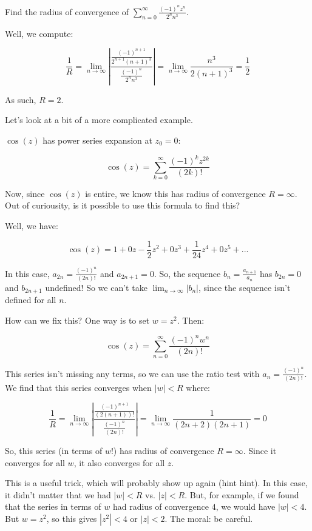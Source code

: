 \begin{ex}{}{} Find the radius of convergence of $\sum_{n = 0}^\infty \frac{(-1)^nz^n}{2^nn^3}$.

Well, we compute:

$$\frac{1}{R} = \lim_{n\rightarrow \infty} \left|\frac{\frac{(-1)^{n+1}}{2^{n+1}(n+1)^3}}{\frac{(-1)^n}{2^nn^3}}\right| = \lim_{n\rightarrow \infty} \frac{n^3}{2(n+1)^3} = \frac{1}{2}$$

As such, $R = 2$.
\end{ex}

Let's look at a bit of a more complicated example.

\begin{ex}{}{} $\cos(z)$ has power series expansion at $z_0 = 0$:

$$\cos(z) = \sum_{k = 0}^\infty \frac{(-1)^kz^{2k}}{(2k)!}$$

Now, since $\cos(z)$ is entire, we know this has radius of convergence $R = \infty$. Out of curiousity, is it possible to use this formula to find this?

Well, we have:

$$\cos(z) = 1 + 0z -\frac{1}{2}z^2 + 0z^3 + \frac{1}{24}z^4 + 0z^5 + ...$$

In this case, $a_{2n} = \frac{(-1)^n}{(2n)!}$ and $a_{2n+1} = 0$. So, the sequence $b_n = \frac{a_{n+1}}{a_n}$ has $b_{2n} = 0$ and $b_{2n+1}$ undefined! So we can't take $\lim_{n\rightarrow \infty}|b_n|$, since the sequence isn't defined for all $n$.

How can we fix this? One way is to set $w = z^2$. Then:

$$\cos(z) = \sum_{n = 0}^\infty \frac{(-1)^nw^n}{(2n)!}$$

This series isn't missing any terms, so we can use the ratio test with $a_n = \frac{(-1)^n}{(2n)!}$. We find that this series converges when $|w| < R$ where:

$$\frac{1}{R} = \lim_{n\rightarrow \infty} \left| \frac{\frac{(-1)^{n+1}}{(2(n+1))!}}{\frac{(-1)^n}{(2n)!}}\right| = \lim_{n\rightarrow \infty} \frac{1}{(2n+2)(2n+1)} = 0$$

So, this series (in terms of $w$!) has radius of convergence $R = \infty$. Since it converges for all $w$, it also converges for all $z$.
\end{ex}

This is a useful trick, which will probably show up again (hint hint). In this case, it didn't matter that we had $|w| < R$ vs. $|z| < R$. But, for example, if we found that the series in terms of $w$ had radius of convergence $4$, we would have $|w| < 4$. But $w = z^2$, so this gives $|z^2|< 4$ or $|z| < 2$. The moral: be careful.

